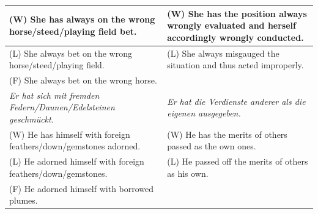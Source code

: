 \documentclass[output=paper]{langsci/langscibook}
\begin{document}
\begin{table}[]
{\begin{tabular}{|l|l|}
(W) She has always on the wrong horse/steed/playing field bet.         & (W) She has the position always wrongly evaluated and herself accordingly wrongly conducted. \\ \hline
(L) She always bet on the wrong horse/steed/playing field.             & (L) She always misgauged the situation and thus acted improperly.                            \\ \hline
(F) She always bet on the wrong horse.                                 &                                                                                              \\ \hline
\textit{Er hat sich mit fremden Federn/Daunen/Edelsteinen geschmückt.} & \textit{Er hat die Verdienste anderer als die eigenen ausgegeben.}                           \\ \hline
(W) He has himself with foreign feathers/down/gemstones adorned.       & (W) He has the merits of others passed as the own ones.                                      \\ \hline
(L) He adorned himself with foreign feathers/down/gemstones.           & (L) He passed off the merits of others as his own.                                           \\ \hline
(F) He adorned himself with borrowed plumes.                           &                                                                                              \\ \hline
\end{tabular}}
\end{table}
\end{document}
